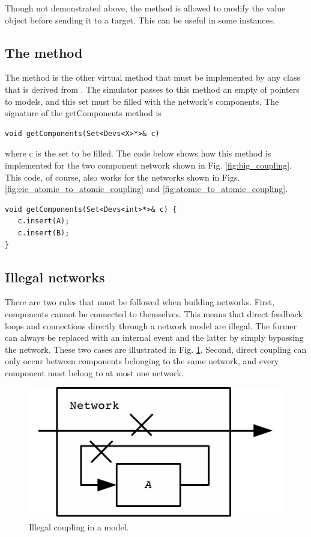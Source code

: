 Though not demonstrated above, the  method is allowed to modify the value object before sending it to a target. This can be useful in some instances.

\subsection{The  method}
The  method is the other virtual method that must be implemented by any class that is derived from . The simulator passes to this method an empty  of pointers to models, and this set must be filled with the network's components. The signature of the getComponents method is
\begin{verbatim}
void getComponents(Set<Devs<X>*>& c)
\end{verbatim}
where c is the set to be filled. The code below shows how this method is implemented for the two component network shown in Fig. \ref{fig:big_coupling}. This code, of course, also works for the networks shown in Figs. \ref{fig:eic_atomic_to_atomic_coupling} and \ref{fig:atomic_to_atomic_coupling}.
\begin{verbatim}
void getComponents(Set<Devs<int>*>& c) {
   c.insert(A);
   c.insert(B);
}
\end{verbatim}

\subsection{Illegal networks}
There are two rules that must be followed when building networks. First, components cannot be connected to themselves. This means that direct feedback loops and connections directly through a network model are illegal. The former can always be replaced with an internal event and the latter by simply bypassing the network. These two cases are illustrated in Fig. \ref{fig:bad_coupling}. Second, direct coupling can only occur between components belonging to the same network, and every component must belong to at most one network.
\begin{figure}[ht]
\centering
\includegraphics{network_models_figs/bad_couplings.pdf}
\caption{Illegal coupling in a  model.}
\label{fig:bad_coupling}
\end{figure}

